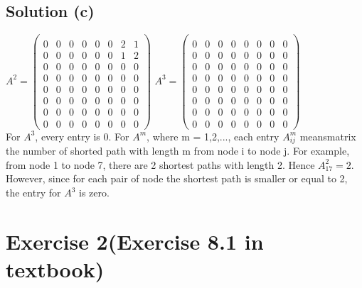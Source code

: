 \documentclass[12pt]{article}%
\begin{document}
\subsection{Solution (c)}
$A^2 = \left(\begin{matrix} 
\\0&0&0&0&0&0&2&1
\\0&0&0&0&0&0&1&2
\\0&0&0&0&0&0&0&0
\\0&0&0&0&0&0&0&0
\\0&0&0&0&0&0&0&0
\\0&0&0&0&0&0&0&0
\\0&0&0&0&0&0&0&0
\\0&0&0&0&0&0&0&0
 \end{matrix}\right)$
 $A^3 = \left(\begin{matrix} 
\\0&0&0&0&0&0&0&0
\\0&0&0&0&0&0&0&0
\\0&0&0&0&0&0&0&0
\\0&0&0&0&0&0&0&0
\\0&0&0&0&0&0&0&0
\\0&0&0&0&0&0&0&0
\\0&0&0&0&0&0&0&0
\\0&0&0&0&0&0&0&0
 \end{matrix}\right)$
 \\
 For $A^3$, every entry is 0. For $A^m$, where m = 1,2,..., each entry $A^m_{ij}$ meansmatrix the number of shorted path with length m from node i to node j. For example, from node 1 to node 7, there are 2 shortest paths with length 2. Hence $A^2_{17}=2$. However, since for each pair of node the shortest path is smaller or equal to 2, the entry for $A^3$ is zero.
 
\section{Exercise 2(Exercise 8.1 in textbook)}
\end{document}
